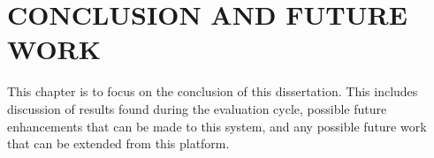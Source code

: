 %
%
%
%  
%

\chapter{\MakeUppercase{Conclusion and Future Work}}
\label{cha:conclusion}

This chapter is to focus on the conclusion of this dissertation. This includes discussion of results found during the evaluation cycle, possible future enhancements that can be made to this system, and any possible future work that can be extended from this platform.